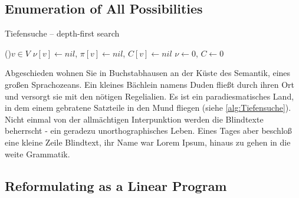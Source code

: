 \documentclass[12pt,a4paper,twoside]{scrartcl}
\numberwithin{equation}{section}
\begin{document}
\subsection{Enumeration of All Possibilities}

\begin{algorithm}
  \caption{Tiefensuche -- depth-first search}\label{alg:Tiefensuche}


  \While(){$v \in V$}{
    $\nu[v] \leftarrow nil$, $\pi[v] \leftarrow nil$, $C[v] \leftarrow nil$ 
  }
  $\nu \leftarrow 0$, $C \leftarrow 0$ 




\end{algorithm}

Abgeschieden wohnen Sie in Buchstabhausen an der Küste des Semantik, eines großen Sprachozeans. Ein kleines Bächlein namens Duden fließt durch ihren Ort und versorgt sie mit den nötigen Regelialien. Es ist ein paradiesmatisches Land, in dem einem gebratene Satzteile in den Mund fliegen (siehe \autoref{alg:Tiefensuche}). Nicht einmal von der allmächtigen Interpunktion werden die Blindtexte beherrscht - ein geradezu unorthographisches Leben. Eines Tages aber beschloß eine kleine Zeile Blindtext, ihr Name war Lorem Ipsum, hinaus zu gehen in die weite Grammatik.

\subsection{Reformulating as a Linear Program}
\end{document}
